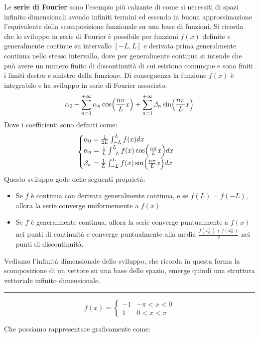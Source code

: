 Le \textbf{serie di Fourier} sono l'esempio più calzante di come si necessiti di spazi infinito dimensionali avendo infiniti termini ed essendo in buona approssimazione l'equivalente della scomposizione funzionale su una base di funzioni. Si ricorda che lo sviluppo in serie di Fourier è possibile per funzioni $f(x)$ definite e generalmente continue su intervallo $[-L,L]$ e derivata prima generalmente continua nello stesso intervallo, dove per generalmente continua si intende che può avere un numero finito di discontinuità di cui esistono comunque e sono finiti i limiti destro e sinistro della funzione. Di conseguenza la funzione $f(x)$ è integrabile e ha sviluppo in serie di Fourier associato:
\begin{equation}
    \label{serie:Fourier}
    \alpha_0 +
    \sum_{n=1}^{+\infty} \alpha_n\cos \Bigl( \frac{n\pi}{L}x \Bigr) +
    \sum_{n=1}^{+\infty} \beta_n\sin \Bigl( \frac{n\pi}{L}x \Bigr)
\end{equation}
Dove i coefficienti sono definiti come:
\begin{equation}
    \label{coef:Fourier}
    \begin{cases}
        \alpha_0 = \frac{1}{2L} \int_{-L}^{L} f(x)dx \\
        \alpha_n = \frac{1}{L} \int_{-L}^{L} f(x) \cos \Bigl( \frac{n\pi}{L}x \Bigr) dx \\
        \beta_n = \frac{1}{L} \int_{-L}^{L} f(x) \sin \Bigl( \frac{n\pi}{L}x \Bigr) dx
    \end{cases}
\end{equation}
Questo sviluppo gode delle seguenti proprietà:
\begin{itemize}
    \item Se $f$ è continua con derivata generalmente continua, e se $f(L)=f(-L)$, allora la serie converge uniformemente a $f(x)$
    \item Se $f$ è generalmente continua, allora la serie converge puntualmente a $f(x)$ nei punti di continuità e converge puntualmente alla media $\frac{f(x_0^+)+f(x_0^-)}{2}$ nei punti di discontinuità.
\end{itemize}
Vediamo l'infinità dimensionale dello sviluppo, che ricorda in questa forma la scomposizione di un vettore su una base dello spazio, emerge quindi una struttura vettoriale infinito dimensionale.

\par\noindent\rule[1pt]{\textwidth}{0.8pt}

\begin{exmp}
    \begin{equation*}
        f(x) =
        \begin{cases}
            -1 & -\pi < x < 0 \\
            1 & 0 < x < \pi
        \end{cases}
    \end{equation*}
\end{exmp}
Che possiamo rappresentare graficamente come:

